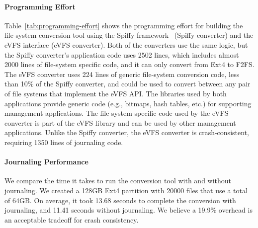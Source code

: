 \vspace{-0.25em}
\paragraph{Programming Effort} Table~\ref{tab:programming-effort} shows the programming effort for building the file-system conversion tool using the Spiffy framework~\cite{sun2018spiffy} (Spiffy converter) and the eVFS interface (eVFS converter). Both of the converters use the same logic, but the Spiffy converter's application code uses 2502 lines, which includes almost 2000 lines of file-system specific code, and it can only convert from Ext4 to F2FS. The eVFS converter uses 224 lines of generic file-system conversion code, less than 10\% of the Spiffy converter, and could be used to convert between any pair of file systems that implement the eVFS API. The libraries used by both applications provide generic code (e.g., bitmaps, hash tables, etc.) for supporting management applications. The file-system specific code used by the eVFS converter is part of the eVFS library and can be used by other management applications. Unlike the Spiffy converter, the eVFS converter is crash-consistent, requiring 1350 lines of journaling code.
  
\vspace{-0.25em}
\paragraph{Journaling Performance} We compare the time it takes to run the conversion tool with and without journaling. We created a 128GB Ext4 partition with 20000 files that use a total of 64GB. On average, it took 13.68 seconds to complete the conversion with journaling, and 11.41 seconds without journaling. We believe a 19.9\% overhead is an acceptable tradeoff for crash consistency.


